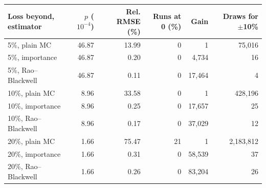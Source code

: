 \begin{tabular}{lrrrrr}
\toprule
Loss beyond, estimator & $p$ ($10^{-4}$) & Rel. RMSE (\%) & Runs at 0 (\%) & Gain & Draws for $\pm$10\% \\
\midrule
5\%, plain MC & 46.87 & 13.99 & 0 & 1 & 75,016 \\
5\%, importance & 46.87 & 0.20 & 0 & 4,734 & 16 \\
5\%, Rao--Blackwell & 46.87 & 0.11 & 0 & 17,464 & 4 \\
10\%, plain MC & 8.96 & 33.58 & 0 & 1 & 428,196 \\
10\%, importance & 8.96 & 0.25 & 0 & 17,657 & 25 \\
10\%, Rao--Blackwell & 8.96 & 0.17 & 0 & 37,029 & 12 \\
20\%, plain MC & 1.66 & 75.47 & 21 & 1 & 2,183,812 \\
20\%, importance & 1.66 & 0.31 & 0 & 58,539 & 37 \\
20\%, Rao--Blackwell & 1.66 & 0.26 & 0 & 83,204 & 26 \\
\bottomrule
\end{tabular}
